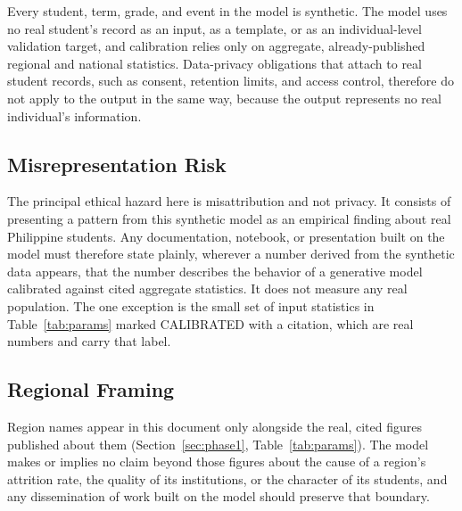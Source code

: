 \documentclass[11pt]{article}
\begin{document}
\hspace*{\parindent}Every student, term, grade, and event in the model is synthetic. The model uses no real student's record as an input, as a template, or as an individual-level validation target, and calibration relies only on aggregate, already-published regional and national statistics. Data-privacy obligations that attach to real student records, such as consent, retention limits, and access control, therefore do not apply to the output in the same way, because the output represents no real individual's information.

\subsection{Misrepresentation Risk}
\label{sec:ethics-B}

\hspace*{\parindent}The principal ethical hazard here is misattribution and not privacy. It consists of presenting a pattern from this synthetic model as an empirical finding about real Philippine students. Any documentation, notebook, or presentation built on the model must therefore state plainly, wherever a number derived from the synthetic data appears, that the number describes the behavior of a generative model calibrated against cited aggregate statistics. It does not measure any real population. The one exception is the small set of input statistics in Table~\ref{tab:params} marked CALIBRATED with a citation, which are real numbers and carry that label.

\subsection{Regional Framing}
\label{sec:ethics-C}

\hspace*{\parindent}Region names appear in this document only alongside the real, cited figures published about them (Section~\ref{sec:phase1}, Table~\ref{tab:params}). The model makes or implies no claim beyond those figures about the cause of a region's attrition rate, the quality of its institutions, or the character of its students, and any dissemination of work built on the model should preserve that boundary.
\end{document}
